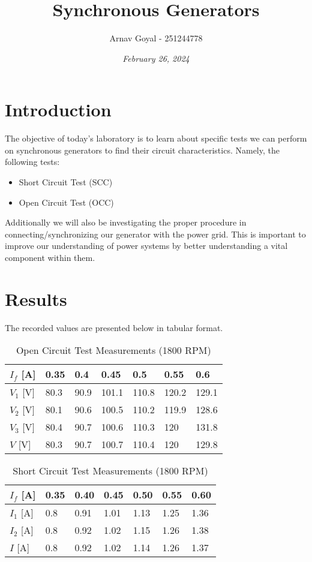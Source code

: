 \documentclass[]{report}
\title{\textbf{Synchronous Generators}}
\date{\textit{February 26, 2024}}
\author{Arnav Goyal - 251244778}
\begin{document}
\maketitle
\section*{Introduction}
The objective of today's laboratory is to learn about specific tests we can perform on synchronous generators to find their circuit characteristics. Namely, the following tests:
\begin{itemize}
	\item Short Circuit Test (SCC)
	\item Open Circuit Test (OCC)
\end{itemize}
Additionally we will also be investigating the proper procedure in connecting/synchronizing our generator with the power grid.
This is important to improve our understanding of power systems by better understanding a vital component within them.

\section*{Results}

The recorded values are presented below in tabular format.


\begin{table}[h] \centering
	\begin{tabular}{@{}l|llllll@{}}
		$I_f$ [A] & 0.35 & 0.4  & 0.45  & 0.5   & 0.55  & 0.6   \\ \hline
		$V_1$ [V] & 80.3 & 90.9 & 101.1 & 110.8 & 120.2 & 129.1 \\ \hline
		$V_2$ [V] & 80.1 & 90.6 & 100.5 & 110.2 & 119.9 & 128.6 \\ \hline
		$V_3$ [V] & 80.4 & 90.7 & 100.6 & 110.3 & 120   & 131.8 \\ \hline
		$V$ [V]  & 80.3 & 90.7 & 100.7 & 110.4 & 120   & 129.8
	\end{tabular}
	\caption{Open Circuit Test Measurements (1800 RPM)}
\end{table}

\begin{table}[h] \centering
	\begin{tabular}{@{}l|llllll@{}}
		$I_f$ [A] & 0.35 & 0.40 & 0.45 & 0.50 & 0.55 & 0.60 \\ \hline
		$I_1$ [A] & 0.8  & 0.91 & 1.01 & 1.13 & 1.25 & 1.36 \\ \hline
		$I_2$ [A] & 0.8  & 0.92 & 1.02 & 1.15 & 1.26 & 1.38 \\ \hline
		$I$ [A]  & 0.8  & 0.92 & 1.02 & 1.14 & 1.26 & 1.37
	\end{tabular}
	\caption{Short Circuit Test Measurements (1800 RPM)}
\end{table}
\end{document}
